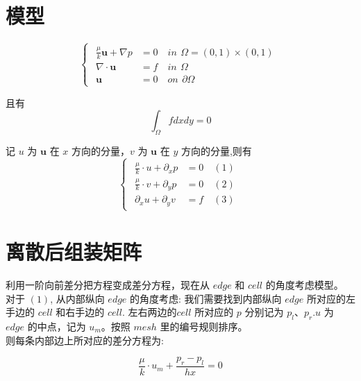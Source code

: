 \documentclass{article}
\begin{document}
\section{模型}
\begin{equation*}
\begin{cases}
\begin{aligned}
\frac{\mu}{k}\mathbf{u} + \nabla p & = 0 \quad in \,\ \Omega = (0,1)\times (0,1) \\
\nabla \cdot \mathbf{u} & = f \quad in \,\ \Omega \\
\mathbf {u} & = 0 \quad on \,\ \partial \Omega
\end{aligned}
\end{cases}
\end{equation*}

且有 \\
\begin{equation*}
\int_{\Omega}f dxdy = 0
\end{equation*}

记 $u$ 为 $\mathbf{u}$ 在 $x$ 方向的分量，$v$ 为 $\mathbf{u}$ 在 $y$ 方向的分量,则有 \\

\begin{equation*}
\begin{cases}
\begin{aligned}
\frac{\mu}{k}\cdot u + \partial_x p & = 0 \quad (1) \\
\frac{\mu}{k}\cdot v + \partial_y p & = 0 \quad (2) \\
\partial_x u + \partial_y v & = f \quad (3)
\end{aligned}
\end{cases}
\end{equation*}

\section{离散后组装矩阵}
利用一阶向前差分把方程变成差分方程，现在从 $edge$ 和 $cell$ 的角度考虑模型。 \\

对于 $(1)$, 从内部纵向 $edge$ 的角度考虑:
我们需要找到内部纵向 $edge$ 所对应的左手边的 $cell$ 和右手边的 $cell$. 左右两边的$cell$ 所对应的 $p$ 分别记为 $p_{l}$、$p_{r}$.$u$ 为 $edge$ 的中点，记为 $u_m$。按照 $mesh$ 里的编号规则排序。\\

则每条内部边上所对应的差分方程为:

\begin{equation*}
\frac{\mu}{k} \cdot u_m + \frac{p_r - p_l}{hx} = 0
\end{equation*}
\end{document}
